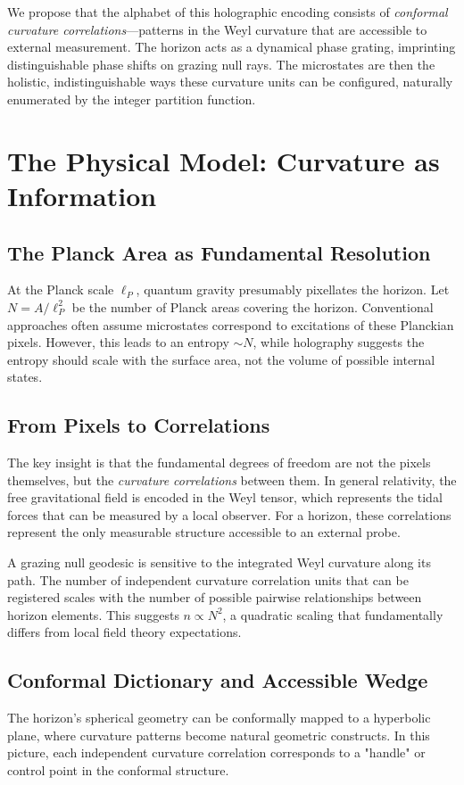 \documentclass[12pt, letterpaper]{article}
\begin{document}
We propose that the alphabet of this holographic encoding consists of \emph{conformal curvature correlations}—patterns in the Weyl curvature that are accessible to external measurement. The horizon acts as a dynamical phase grating, imprinting distinguishable phase shifts on grazing null rays. The microstates are then the holistic, indistinguishable ways these curvature units can be configured, naturally enumerated by the integer partition function.

\section{The Physical Model: Curvature as Information}
\label{sec:model}

\subsection{The Planck Area as Fundamental Resolution}
At the Planck scale $\ell_P$, quantum gravity presumably pixellates the horizon. Let $N = A/\ell_P^2$ be the number of Planck areas covering the horizon. Conventional approaches often assume microstates correspond to excitations of these Planckian pixels. However, this leads to an entropy $\sim N$, while holography suggests the entropy should scale with the surface area, not the volume of possible internal states.

\subsection{From Pixels to Correlations}
The key insight is that the fundamental degrees of freedom are not the pixels themselves, but the \emph{curvature correlations} between them. In general relativity, the free gravitational field is encoded in the Weyl tensor, which represents the tidal forces that can be measured by a local observer. For a horizon, these correlations represent the only measurable structure accessible to an external probe.

A grazing null geodesic is sensitive to the integrated Weyl curvature along its path. The number of independent curvature correlation units that can be registered scales with the number of possible pairwise relationships between horizon elements. This suggests $n \propto N^2$, a quadratic scaling that fundamentally differs from local field theory expectations.

\subsection{Conformal Dictionary and Accessible Wedge}
The horizon's spherical geometry can be conformally mapped to a hyperbolic plane, where curvature patterns become natural geometric constructs. In this picture, each independent curvature correlation corresponds to a "handle" or control point in the conformal structure. 
\end{document}
